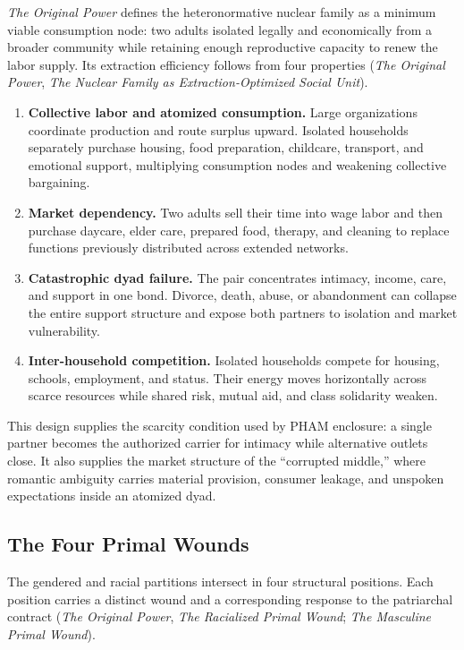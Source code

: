 \documentclass[12pt]{article}
\newcommand{\OP}{\textit{The Original Power}}
\begin{document}
\OP{} defines the heteronormative nuclear family as a minimum viable consumption node: two adults isolated legally and economically from a broader community while retaining enough reproductive capacity to renew the labor supply. Its extraction efficiency follows from four properties (\OP{}, \textit{The Nuclear Family as Extraction-Optimized Social Unit}).

\begin{enumerate}
  \item \textbf{Collective labor and atomized consumption.} Large organizations coordinate production and route surplus upward. Isolated households separately purchase housing, food preparation, childcare, transport, and emotional support, multiplying consumption nodes and weakening collective bargaining.
  \item \textbf{Market dependency.} Two adults sell their time into wage labor and then purchase daycare, elder care, prepared food, therapy, and cleaning to replace functions previously distributed across extended networks.
  \item \textbf{Catastrophic dyad failure.} The pair concentrates intimacy, income, care, and support in one bond. Divorce, death, abuse, or abandonment can collapse the entire support structure and expose both partners to isolation and market vulnerability.
  \item \textbf{Inter-household competition.} Isolated households compete for housing, schools, employment, and status. Their energy moves horizontally across scarce resources while shared risk, mutual aid, and class solidarity weaken.
\end{enumerate}

This design supplies the scarcity condition used by PHAM enclosure: a single partner becomes the authorized carrier for intimacy while alternative outlets close. It also supplies the market structure of the “corrupted middle,” where romantic ambiguity carries material provision, consumer leakage, and unspoken expectations inside an atomized dyad.

\subsection{The Four Primal Wounds}
\label{sec:wound_map}

The gendered and racial partitions intersect in four structural positions. Each position carries a distinct wound and a corresponding response to the patriarchal contract (\OP{}, \textit{The Racialized Primal Wound}; \textit{The Masculine Primal Wound}).
\end{document}
